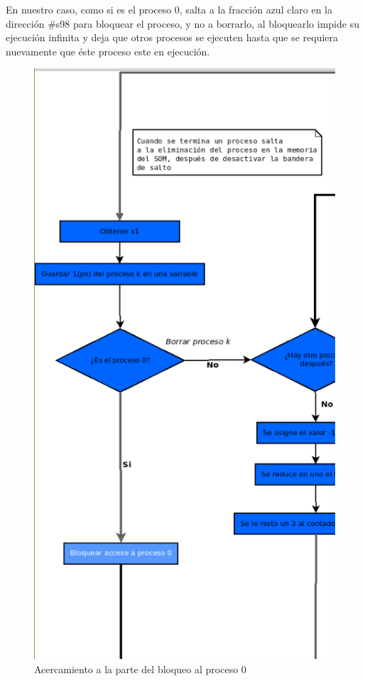 \documentclass[letterpaper,12pt,oneside]{book}
\begin{document}
        En nuestro caso, como si es el proceso 0, salta a la fracción azul claro en la dirección \#s98 para bloquear el proceso, y no 
		a borrarlo, al bloquearlo impide su ejecución infinita y deja que otros procesos se ejecuten hasta que se requiera nuevamente que éste proceso este en ejecución.

        \begin{figure}[h]		
			\centering
			\includegraphics[scale=0.42]{media/CARDIACC/diagBloquearProceso.png}
			\caption{ Acercamiento a la parte del bloqueo al proceso 0}
			\label{fig:diagBloqP0}
		\end{figure}
  
\end{document}

